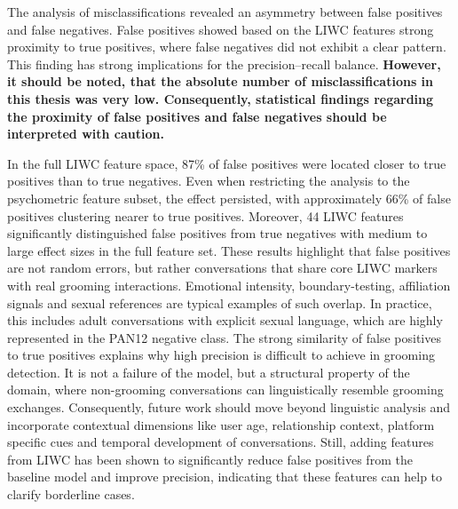 The analysis of misclassifications revealed an asymmetry between false positives and false negatives. False positives showed based on the LIWC features strong proximity to true positives, where false negatives did not exhibit a clear pattern. This finding has strong implications for the precision–recall balance. \textbf{However, it should be noted, that the absolute number of misclassifications in this thesis was very low. Consequently, statistical findings regarding the proximity of false positives and false negatives should be interpreted with caution.}

In the full LIWC feature space, 87\% of false positives were located closer to true positives than to true negatives. Even when restricting the analysis to the psychometric feature subset, the effect persisted, with approximately 66\% of false positives clustering nearer to true positives. Moreover, 44 LIWC features significantly distinguished false positives from true negatives with medium to large effect sizes in the full feature set. These results highlight that false positives are not random errors, but rather conversations that share core LIWC markers with real grooming interactions. Emotional intensity, boundary-testing, affiliation signals and sexual references are typical examples of such overlap. In practice, this includes adult conversations with explicit sexual language, which are highly represented in the PAN12 negative class. The strong similarity of false positives to true positives explains why high precision is difficult to achieve in grooming detection. It is not a failure of the model, but a structural property of the domain, where non-grooming conversations can linguistically resemble grooming exchanges. Consequently, future work should move beyond linguistic analysis and incorporate contextual dimensions like user age, relationship context, platform specific cues and temporal development of conversations. Still, adding features from LIWC has been shown to significantly reduce false positives from the baseline model and improve precision, indicating that these features can help to clarify borderline cases.

